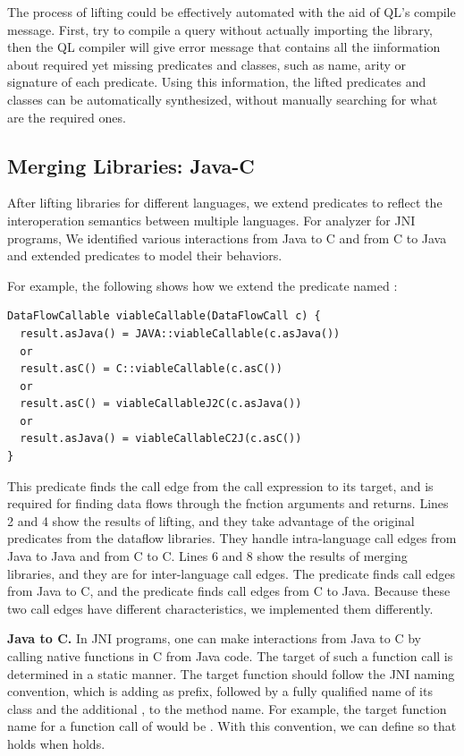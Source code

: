 The process of lifting could be effectively automated with the aid of
QL's compile message. First, try to compile a query without actually
importing the library, then the QL compiler will give error message
that contains all the iinformation about required yet missing predicates and classes,
such as name, arity or signature of each predicate. Using this information,
the lifted predicates and classes can be automatically synthesized, without
manually searching for what are the required ones.

\subsection{Merging Libraries: Java-C}\label{sec:merging}
After lifting libraries for different languages, we extend predicates to
reflect the interoperation semantics between multiple languages.
For analyzer for JNI programs, We identified various interactions from Java to C and from C to Java
and extended predicates to model their behaviors.

For example, the following shows how we extend the predicate
named :
\begin{lstlisting}[style=codeql,xleftmargin=2.5em]
DataFlowCallable viableCallable(DataFlowCall c) {
  result.asJava() = JAVA::viableCallable(c.asJava())
  or
  result.asC() = C::viableCallable(c.asC())
  or
  result.asC() = viableCallableJ2C(c.asJava())
  or
  result.asJava() = viableCallableC2J(c.asC())
}
\end{lstlisting}
This predicate finds the call edge from the call expression to its
target, and is required for finding data flows through the fnction arguments and returns.
Lines 2 and 4 show the results of lifting, and they take advantage of the
original predicates from the dataflow libraries.  They handle
intra-language call edges from Java to Java and from C to C.
Lines 6 and 8 show the results of merging libraries, and they are
for inter-language call edges.  The predicate  finds call edges
from Java to C, and the predicate  finds call edges from
C to Java. Because these two call edges have different characteristics, we
implemented them differently.

\textbf{Java to C.} In JNI programs, one can make interactions from
Java to C by calling native functions in C from Java code. The target
of such a function call is determined in a static manner.
The target function should follow the JNI naming convention, which is adding
 as prefix, 
followed by a fully qualified name of its class and the additional \codeql{\_}, to the method name.
For example, the target function name for a function call of
 would be .
With this convention, we can define 
so that  holds when
 holds.


